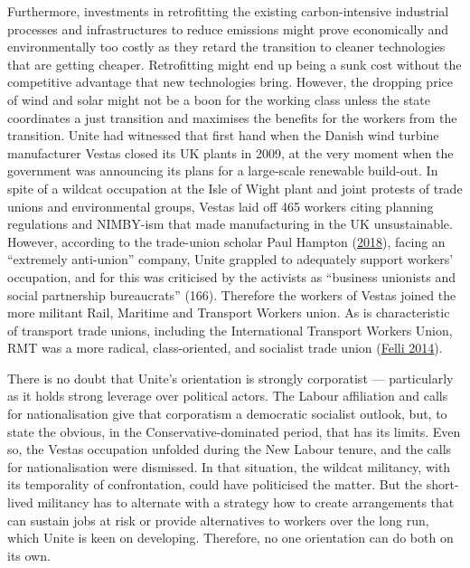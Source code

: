 \documentclass[a4paper, nobind]{templates/ociamthesis}
\begin{document}
Furthermore, investments in retrofitting the existing carbon-intensive industrial processes and infrastructures to reduce emissions might prove economically and environmentally too costly as they retard the transition to cleaner technologies that are getting cheaper. Retrofitting might end up being a sunk cost without the competitive advantage that new technologies bring. However, the dropping price of wind and solar might not be a boon for the working class unless the state coordinates a just transition and maximises the benefits for the workers from the transition. Unite had witnessed that first hand when the Danish wind turbine manufacturer Vestas closed its UK plants in 2009, at the very moment when the government was announcing its plans for a large-scale renewable build-out. In spite of a wildcat occupation at the Isle of Wight plant and joint protests of trade unions and environmental groups, Vestas laid off 465 workers citing planning regulations and NIMBY-ism that made manufacturing in the UK unsustainable. However, according to the trade-union scholar Paul Hampton (\protect\hyperlink{ref-hampton_trade_2018}{2018}), facing an ``extremely anti-union'' company, Unite grappled to adequately support workers' occupation, and for this was criticised by the activists as ``business unionists and social partnership bureaucrats'' (166). Therefore the workers of Vestas joined the more militant Rail, Maritime and Transport Workers union. As is characteristic of transport trade unions, including the International Transport Workers Union, RMT was a more radical, class-oriented, and socialist trade union (\protect\hyperlink{ref-felli_alternative_2014}{Felli 2014}).

There is no doubt that Unite's orientation is strongly corporatist --- particularly as it holds strong leverage over political actors. The Labour affiliation and calls for nationalisation give that corporatism a democratic socialist outlook, but, to state the obvious, in the Conservative-dominated period, that has its limits. Even so, the Vestas occupation unfolded during the New Labour tenure, and the calls for nationalisation were dismissed. In that situation, the wildcat militancy, with its temporality of confrontation, could have politicised the matter. But the short-lived militancy has to alternate with a strategy how to create arrangements that can sustain jobs at risk or provide alternatives to workers over the long run, which Unite is keen on developing. Therefore, no one orientation can do both on its own.
\end{document}
